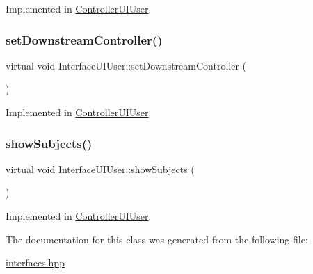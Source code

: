 Implemented in \hyperlink{class_controller_u_i_user_a6ec069819ab7fe85b8419ee00714b8a3}{Controller\+U\+I\+User}.

\mbox{\label{class_interface_u_i_user_a304a797f05d78a08f3ed2116c7a0028a}} 
\subsubsection{\texorpdfstring{set\+Downstream\+Controller()}{setDownstreamController()}}
{\footnotesize\ttfamily virtual void Interface\+U\+I\+User\+::set\+Downstream\+Controller (\begin{DoxyParamCaption}\item[{\hyperlink{class_interface_b_l_user}{Interface\+B\+L\+User} $\ast$}]{ }\end{DoxyParamCaption})\hspace{0.3cm}{\ttfamily [pure virtual]}}



Implemented in \hyperlink{class_controller_u_i_user_ad4ad2668cd963c5fa733bb8988268d99}{Controller\+U\+I\+User}.

\mbox{\label{class_interface_u_i_user_ad3e4efe4c7292c8a677fd8eeefcf6ae4}} 
\subsubsection{\texorpdfstring{show\+Subjects()}{showSubjects()}}
{\footnotesize\ttfamily virtual void Interface\+U\+I\+User\+::show\+Subjects (\begin{DoxyParamCaption}\item[{\hyperlink{class_user}{User} $\ast$}]{ }\end{DoxyParamCaption})\hspace{0.3cm}{\ttfamily [pure virtual]}}



Implemented in \hyperlink{class_controller_u_i_user_a98a0e51ff5b82264bdda2683e5b19e36}{Controller\+U\+I\+User}.



The documentation for this class was generated from the following file\+:\begin{DoxyCompactItemize}
\item 
\hyperlink{interfaces_8hpp}{interfaces.\+hpp}\end{DoxyCompactItemize}
